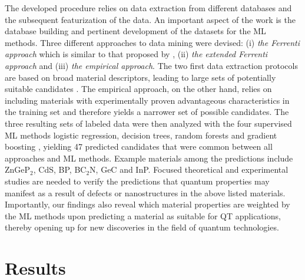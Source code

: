 \documentclass[superscriptaddress,
preprint,
 amsmath,amssymb,
 aps,
]{revtex4-2}
\begin{document}
The developed procedure relies on data extraction from different databases and the subsequent featurization of the data. 
An important aspect of the work is the database building and pertinent development of the datasets for the ML methods. Three different approaches to data mining were devised: (i) \emph{the Ferrenti approach} which is similar to that proposed by \citeauthor{Ferrenti2020} \cite{Ferrenti2020}, (ii) \emph{the extended Ferrenti approach} and (iii) \emph{the empirical approach}. The two first data extraction protocols are based on broad material descriptors, leading to large sets of potentially suitable candidates \cite{Mehta2019,Hastie2009}. The empirical approach, on the other hand, relies on including materials with experimentally proven advantageous characteristics in the training set and therefore yields a narrower set of possible candidates. The three resulting sets of labeled data were then analyzed with the four supervised ML methods logistic regression, decision trees, random forests and gradient boosting \cite{Hastie2009,Murphy2012}, yielding \num{47} predicted candidates that were common between all approaches and ML methods.
Example materials among the predictions include ZnGeP$_2$, CdS, BP, BC$_2$N, GeC and InP. Focused theoretical and experimental studies 
are needed to verify the predictions that quantum properties may manifest as a result of defects or nanostructures in the above listed materials. 
Importantly, our findings also reveal which material properties are weighted by the ML methods upon predicting a material as suitable for QT applications, thereby opening up for new  discoveries in the field of quantum technologies. 


\section*{Results}
\end{document}
